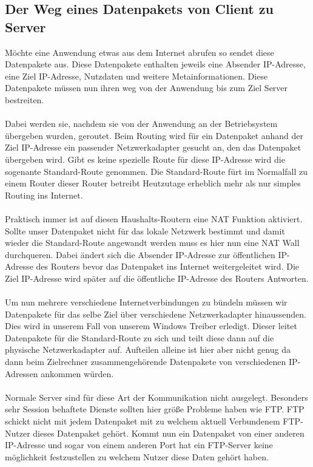 \subsection{Der Weg eines Datenpakets von Client zu Server}
Möchte eine Anwendung etwas aus dem Internet abrufen so sendet diese Datenpakete aus. Diese Datenpakete enthalten jeweils eine Absender IP-Adresse, eine Ziel IP-Adresse, Nutzdaten und weitere Metainformationen. Diese Datenpakete müssen nun ihren weg von der Anwendung bis zum Ziel Server bestreiten. 
\\\\
Dabei werden sie, nachdem sie von der Anwendung an der Betriebsystem übergeben wurden, geroutet. Beim Routing wird für ein Datenpaket anhand der Ziel IP-Adresse ein passender Netzwerkadapter gesucht an, den das Datenpaket übergeben wird. Gibt es keine spezielle Route für diese IP-Adresse wird die sogenante Standard-Route genommen. Die Standard-Route fürt im Normalfall zu einem Router dieser Router betreibt Heutzutage erheblich mehr als nur simples Routing ins Internet. 
\\\\
Praktisch immer ist auf diesen Haushalts-Routern eine NAT Funktion aktiviert. Sollte unser Datenpaket nicht für das lokale Netzwerk bestimmt und damit wieder die Standard-Route angewandt werden muss es hier nun eine NAT Wall durchqueren. Dabei ändert sich die Absender IP-Adresse zur öffentlichen IP-Adresse des Routers bevor das Datenpaket ins Internet weitergeleitet wird. Die Ziel IP-Adresse wird später auf die öffentliche IP-Adresse des Routers Antworten.
\\\\
Um nun mehrere verschiedene Internetverbindungen zu bündeln müssen wir Datenpakete für das selbe Ziel über verschiedene Netzwerkadapter hinaussenden. Dies wird in unserem Fall von unserem Windows Treiber erledigt. Dieser leitet Datenpakete für die Standard-Route zu sich und teilt diese dann auf die physische Netzwerkadapter auf. Aufteilen alleine ist hier aber nicht genug da dann beim Zielrechner zusammengehörende Datenpakete von verschiedenen IP-Adressen ankommen würden. 
\\\\
Normale Server sind für diese Art der Kommunikation nicht ausgelegt. Besonders sehr Session behaftete Dienste sollten hier größe Probleme haben wie FTP. FTP schickt nicht mit jedem Datenpaket mit zu welchem aktuell Verbundenem FTP-Nutzer dieses Datenpaket gehört. Kommt nun ein Datenpaket von einer anderen IP-Adresse und sogar von einem anderen Port hat ein FTP-Server keine möglichkeit festzustellen zu welchem Nutzer diese Daten gehört haben. 
